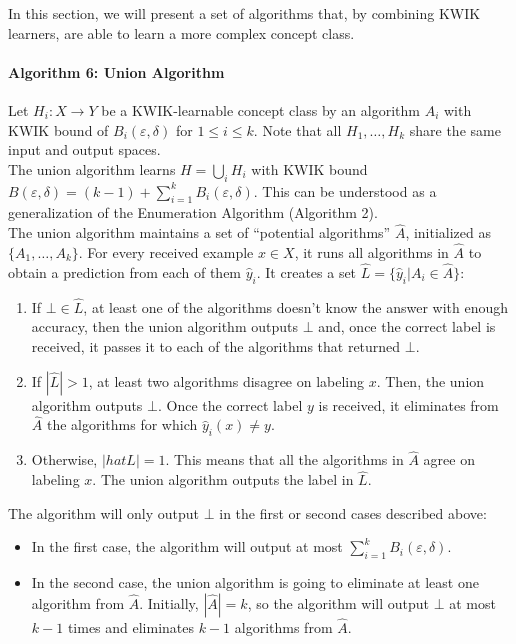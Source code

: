 
In this section, we will present a set of algorithms that, by combining KWIK
learners, are able to learn a more complex concept class. \\

\paragraph{Algorithm 6: Union Algorithm}
Let $H_i: X \to Y$ be a KWIK-learnable concept class by an algorithm $A_i$
with KWIK bound of $B_i(\varepsilon, \delta)$ for $1 \leq i \leq k$. Note that
all $H_1, \ldots, H_k$ share the same input and output spaces. \\

The union algorithm learns $H = \bigcup_i H_i$ with KWIK bound $B(\varepsilon,
\delta) = (k - 1) + \sum_{i = 1}^k B_i(\varepsilon, \delta)$. This can be
understood as a generalization of the Enumeration Algorithm (Algorithm 2). \\

The union algorithm maintains a set of ``potential algorithms'' $\hat{A}$,
initialized as $\{ A_1, \ldots, A_k \}$. For every received example
$x \in X$, it runs all algorithms in $\hat{A}$ to obtain a prediction from each
of them $\hat{y}_i$. It creates a set $\hat{L} = \{ \hat{y}_i | A_i \in \hat{A} \}$:
\begin{enumerate}
  \item If $\bot \in \hat{L}$, at least one of the algorithms doesn't know the
  answer with enough accuracy, then the union algorithm outputs $\bot$ and, once
  the correct label is received, it passes it to each of the algorithms that
  returned $\bot$.
  \item If $|\hat{L}| > 1$, at least two algorithms disagree on labeling $x$.
  Then, the union algorithm outputs $\bot$. Once the correct label $y$ is
  received, it eliminates from $\hat{A}$ the algorithms for which $\hat{y}_i(x)
  \neq y$.
  \item Otherwise, $|hat{L}| = 1$. This means that all the algorithms in
  $\hat{A}$ agree on labeling $x$. The union algorithm outputs the label in
  $\hat{L}$.
\end{enumerate}

The algorithm will only output $\bot$ in the first or second cases described
above:
\begin{itemize}
  \item In the first case, the algorithm will output at most $\sum_{i = 1}^k
  B_i(\varepsilon, \delta)$.
  \item In the second case, the union algorithm is going to eliminate at least one
  algorithm from $\hat{A}$. Initially, $|\hat{A}| = k$, so the algorithm will
  output $\bot$ at most $k - 1$ times and eliminates $k - 1$ algorithms from
  $\hat{A}$.
\end{itemize}

